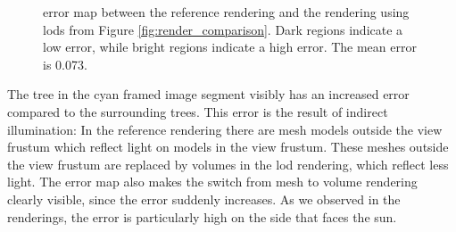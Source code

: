 \begin{figure}[t]
    \centering
	\caption[\FLIP error map between reference and default \ac{lod} heuristic]{\FLIP error map between the reference rendering and the rendering using \acsp{lod} from Figure \ref{fig:render_comparison}. Dark regions indicate a low error, while bright regions indicate a high error. The mean \FLIP error is 0.073.}
	\label{fig:error_map}
\end{figure}
The tree in the cyan framed image segment visibly has an increased error compared to the surrounding trees.
This error is the result of indirect illumination: In the reference rendering there are mesh models outside the view frustum which reflect light on models in the view frustum.
These meshes outside the view frustum are replaced by volumes in the \ac{lod} rendering, which reflect less light.
The error map also makes the switch from mesh to volume rendering clearly visible, since the error suddenly increases.
As we observed in the renderings, the error is particularly high on the side that faces the sun.

